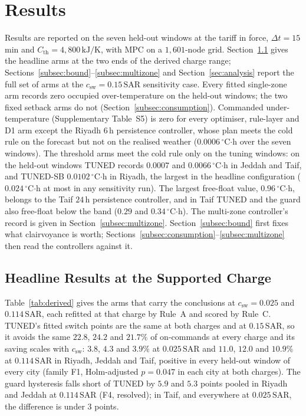 \documentclass[pdflatex,sn-mathphys-num,iicol]{sn-jnl}
\theoremstyle{thmstyleone}\newtheorem{proposition}{Proposition}\newtheorem{corollary}{Corollary}
\theoremstyle{thmstyletwo}\newtheorem{remark}{Remark}\newtheorem{observation}{Observation}
\theoremstyle{thmstylethree}\newtheorem{definition}{Definition}
\newcommand{\Cth}{C_{\mathrm{th}}}
\newcommand{\csw}{c_{\mathrm{sw}}}
\newcommand{\SAR}{\text{SAR}}
\begin{document}
\section{Results}
\label{sec:results}

Results are reported on the seven held-out windows at the tariff in force, $\Delta t=15\,$min and $\Cth=4{,}800\,\text{kJ/K}$, with MPC on a $1{,}601$-node grid. Section~\ref{subsec:derived} gives the headline arms at the two ends of the derived charge range; Sections~\ref{subsec:bound}--\ref{subsec:multizone} and Section~\ref{sec:analysis} report the full set of arms at the $\csw=0.15\,\SAR$ sensitivity case. Every fitted single-zone arm records zero occupied over-temperature on the held-out windows; the two fixed setback arms do not (Section~\ref{subsec:consumption}). Commanded under-temperature (Supplementary Table~S5) is zero for every optimiser, rule-layer and D1 arm except the Riyadh $6\,$h persistence controller, whose plan meets the cold rule on the forecast but not on the realised weather ($0.0006\,^\circ$C$\cdot$h over the seven windows). The threshold arms meet the cold rule only on the tuning windows: on the held-out windows TUNED records $0.0007$ and $0.0066\,^\circ$C$\cdot$h in Jeddah and Taif, and TUNED-SB $0.0102\,^\circ$C$\cdot$h in Riyadh, the largest in the headline configuration ($0.024\,^\circ$C$\cdot$h at most in any sensitivity run). The largest free-float value, $0.96\,^\circ$C$\cdot$h, belongs to the Taif $24\,$h persistence controller, and in Taif TUNED and the guard also free-float below the band ($0.29$ and $0.34\,^\circ$C$\cdot$h). The multi-zone controller's record is given in Section~\ref{subsec:multizone}. Section~\ref{subsec:bound} first fixes what clairvoyance is worth; Sections~\ref{subsec:consumption}--\ref{subsec:multizone} then read the controllers against it.
 
\subsection{Headline Results at the Supported Charge}
\label{subsec:derived}

Table~\ref{tab:derived} gives the arms that carry the conclusions at $\csw=0.025$ and $0.114\,\SAR$, each refitted at that charge by Rule~A and scored by Rule~C. TUNED's fitted switch points are the same at both charges and at $0.15\,\SAR$, so it avoids the same $22.8$, $24.2$ and $21.7\%$ of on-commands at every charge and its saving scales with $\csw$: $3.8$, $4.3$ and $3.9\%$ at $0.025\,\SAR$ and $11.0$, $12.0$ and $10.9\%$ at $0.114\,\SAR$ in Riyadh, Jeddah and Taif, positive in every held-out window of every city (family F1, Holm-adjusted $p=0.047$ in each city at both charges). The guard hysteresis falls short of TUNED by $5.9$ and $5.3$ points pooled in Riyadh and Jeddah at $0.114\,\SAR$ (F4, resolved); in Taif, and everywhere at $0.025\,\SAR$, the difference is under $3$ points.
\end{document}
